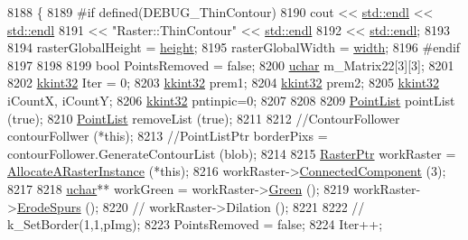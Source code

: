 \begin{DoxyCode}
8188 \{
8189 \textcolor{preprocessor}{  #if  defined(DEBUG\_ThinContour)}
8190   cout << \hyperlink{namespace_k_k_b_ad1f50f65af6adc8fa9e6f62d007818a8}{std::endl} << \hyperlink{namespace_k_k_b_ad1f50f65af6adc8fa9e6f62d007818a8}{std::endl} 
8191        << \textcolor{stringliteral}{"Raster::ThinContour"} << \hyperlink{namespace_k_k_b_ad1f50f65af6adc8fa9e6f62d007818a8}{std::endl}
8192        << \hyperlink{namespace_k_k_b_ad1f50f65af6adc8fa9e6f62d007818a8}{std::endl};
8193 
8194     rasterGlobalHeight = \hyperlink{class_k_k_b_1_1_raster_af39ff189de4fbb6de98392e187efafb7}{height};
8195     rasterGlobalWidth  = \hyperlink{class_k_k_b_1_1_raster_ae0bcc103e191c3421d7692dc69ceb554}{width};
8196 \textcolor{preprocessor}{  #endif}
8197 
8198 
8199   \textcolor{keywordtype}{bool}   PointsRemoved = \textcolor{keyword}{false};
8200   \hyperlink{namespace_k_k_b_ace9969169bf514f9ee6185186949cdf7}{uchar}  m\_Matrix22[3][3];
8201 
8202   \hyperlink{namespace_k_k_b_a8fa4952cc84fda1de4bec1fbdd8d5b1b}{kkint32}  Iter = 0;
8203   \hyperlink{namespace_k_k_b_a8fa4952cc84fda1de4bec1fbdd8d5b1b}{kkint32}  prem1;
8204   \hyperlink{namespace_k_k_b_a8fa4952cc84fda1de4bec1fbdd8d5b1b}{kkint32}  prem2;
8205   \hyperlink{namespace_k_k_b_a8fa4952cc84fda1de4bec1fbdd8d5b1b}{kkint32}  iCountX, iCountY;
8206   \hyperlink{namespace_k_k_b_a8fa4952cc84fda1de4bec1fbdd8d5b1b}{kkint32}  pntinpic=0;
8207 
8208   
8209   \hyperlink{class_k_k_b_1_1_point_list}{PointList}  pointList  (\textcolor{keyword}{true});
8210   \hyperlink{class_k_k_b_1_1_point_list}{PointList}  removeList (\textcolor{keyword}{true});
8211 
8212   \textcolor{comment}{//ContourFollower contourFollwer (*this);}
8213   \textcolor{comment}{//PointListPtr  borderPixs = contourFollower.GenerateContourList (blob);}
8214 
8215   \hyperlink{class_k_k_b_1_1_raster}{RasterPtr} workRaster = \hyperlink{class_k_k_b_1_1_raster_aa879980d112c01cb7ad9a3cfc7cd6f64}{AllocateARasterInstance} (*\textcolor{keyword}{this});
8216   workRaster->\hyperlink{class_k_k_b_1_1_raster_a3062e4d08b104319c1da0561017eb6f7}{ConnectedComponent} (3);
8217 
8218   \hyperlink{namespace_k_k_b_ace9969169bf514f9ee6185186949cdf7}{uchar}**   workGreen  = workRaster->\hyperlink{class_k_k_b_1_1_raster_a2dbd81f2cb60b3716bcf6467050dde93}{Green} ();
8219   workRaster->\hyperlink{class_k_k_b_1_1_raster_a282cb542ba0069ee5da5c82913390f46}{ErodeSpurs} ();
8220   \textcolor{comment}{// workRaster->Dilation ();}
8221 
8222   \textcolor{comment}{//   k\_SetBorder(1,1,pImg);}
8223   PointsRemoved = \textcolor{keyword}{false};
8224   Iter++;

\end{DoxyCode}
